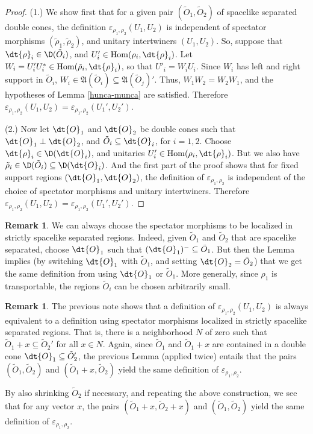 \documentclass[12pt]{article}
\newcommand{\alg}[1]{\mathfrak{#1}}
\theoremstyle{definition}
\theoremstyle{definition}
\newtheorem{note}[thm]{Remark}
\theoremstyle{remark}
\newcommand{\ve}{\varepsilon}
\def\wt#1{{\tilde #1}}
\newcommand{\Hom}{\mathrm{Hom}}
\begin{document}
\begin{proof} (1.) We show first that for a given pair $(\wt O_1,\wt O_2)$ of
  spacelike separated double cones, the definition $\ve _{\rho _1,\rho _2}(U_1,U_2)$
  is independent of spectator morphisms $(\wt \rho _1,\wt \rho _2)$, and unitary
  intertwiners $(U_1,U_2)$.  So, suppose that $\dt{\rho}_i\in \D (\wt O_i)$, and
  $U'_i\in \Hom (\rho _i,\dt{\rho} _i )$.  Let $W_i=U_i'U_i^*\in \Hom (\wt \rho
  _i,\dt{\rho} _i)$, so that $U'_i=W_iU_i$.  Since $W_i$ has left and right support
  in $\wt O_i$, $W _i\in \alg{A}(\wt O_i)\subseteq \alg{A}(\wt O_j)'$.  Thus,
  $W_1W_2=W_2W_1$, and the hypotheses of Lemma \ref{hunca-munca} are satisfied.
  Therefore $\ve _{\rho _1,\rho _2}(U_1,U_2)=\ve _{\rho _1,\rho _2}(U_1',U_2')$.

  \bigskip (2.) Now let $\dt{O}_1$ and $\dt{O}_2$ be double cones such that
  $\dt{O}_1\perp \dt{O}_2$, and $\wt O_i\subseteq \dt{O}_i$, for $i=1,2$.  Choose
  $\dt{\rho}_i\in \D (\dt{O}_i)$, and unitaries $U_i'\in \Hom (\rho _i,\dt{\rho}_i)$.
  But we also have $\wt \rho _i\in \D (\wt O_i)\subseteq \D (\dt{O}_i)$.  And the
  first part of the proof shows that for fixed support regions $(\dt{O}_1,\dt{O}_2)$,
  the definition of $\ve _{\rho _1,\rho _2}$ is independent of the choice of
  spectator morphisms and unitary intertwiners.  Therefore $\ve _{\rho _1,\rho
    _2}(U_1,U_2)=\ve _{\rho _1,\rho _2}(U_1',U_2')$.
\end{proof}

\begin{note} We can always choose the spectator morphisms to be localized in strictly
  spacelike separated regions.  Indeed, given $\wt O_1$ and $\wt O_2$ that are
  spacelike separated, choose $\dt{O}_1$ such that $(\dt{O}_1)^{-}\subseteq \wt O_1$.
  But then the Lemma implies (by switching $\dt{O}_1$ with $\wt O_1$, and setting
  $\dt{O}_2=\wt O_2$) that we get the same definition from using $\dt{O}_1$ or $\wt
  O_1$.  More generally, since $\rho _1$ is transportable, the regions $\wt O_i$ can
  be chosen arbitrarily small.
\end{note}

\begin{note} The previous note shows that a definition of $\ve _{\rho _1,\rho
    _2}(U_1,U_2)$ is always equivalent to a definition using spectator morphisms
  localized in strictly spacelike separated regions.  That is, there is a
  neighborhood $N$ of zero such that $\wt O_1+x\subseteq \wt O_2'$ for all $x\in N$.
  Again, since $\wt O_1$ and $\wt O_1+x$ are contained in a double cone
  $\dt{O}_1\subseteq \wt O_2'$, the previous Lemma (applied twice) entails that the
  pairs $(\wt O_1,\wt O_2)$ and $(\wt O_1+x,\wt O_2)$ yield the same definition of
  $\ve _{\rho _1,\rho _2}$.

  By also shrinking $\wt O_2$ if necessary, and repeating the above construction, we
  see that for any vector $x$, the pairs $(\wt O_1+x,\wt O_2+x)$ and $(\wt O_1,\wt
  O_2)$ yield the same definition of $\ve _{\rho _1,\rho _2}$. \label{translate}
\end{note}
\end{document}
